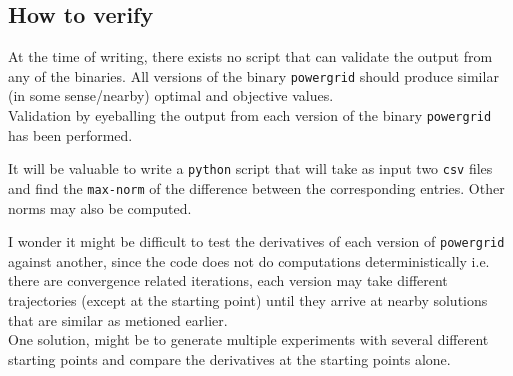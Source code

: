 \subsection{How to verify}
At the time of writing, there exists no script that can validate the output from any of the binaries. All versions of the binary \texttt{powergrid} should produce similar (in some sense/nearby) optimal and objective values.\\

\noindent Validation by eyeballing the output from each version of the binary  \texttt{powergrid} has been performed. 

\begin{TodoPar}
\noindent It will be valuable to write a \texttt{python} script that will take as input two \texttt{csv} files and find the \texttt{max-norm} of the difference between the corresponding entries. Other norms may also be computed. 
\end{TodoPar}

\begin{HypoPar}
\noindent I wonder it might be difficult to test the derivatives of each version of \texttt{powergrid} against another, since the code does not do computations deterministically i.e. there are convergence related iterations, each version may take different trajectories (except at the starting point) until they arrive at nearby solutions that are similar as metioned earlier.\\

\noindent One solution, might be to generate multiple experiments with several different starting points and compare the derivatives at the starting points alone.
\end{HypoPar}


